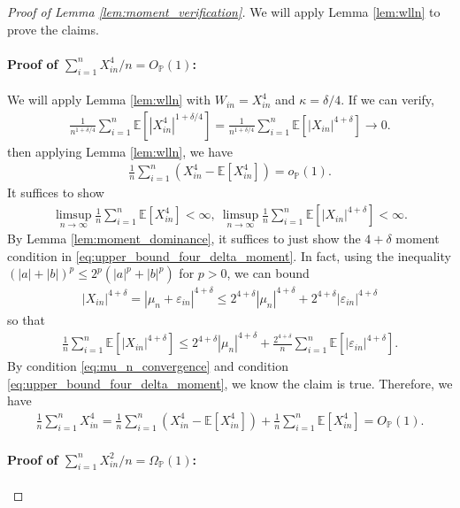 \documentclass[12pt]{article}
\theoremstyle{definition}
\def\P{\mathbb{P}}
\def\P{\mathbb{P}}
\newcommand{\E}{\mathbb E}								%
\renewcommand{\P}{\mathbb{P}}							%
\begin{document}
	\begin{proof}[Proof of Lemma \ref{lem:moment_verification}]
		We will apply Lemma \ref{lem:wlln} to prove the claims. 
	
		\paragraph{Proof of $\sum_{i=1}^n X_{in}^4/n=O_{\P}(1)$:}
		
		We will apply Lemma \ref{lem:wlln} with $W_{in}=X_{in}^4$ and $\kappa=\delta/4$. If we can verify,
		\begin{align*}
			\frac{1}{n^{1+\delta/4}}\sum_{i=1}^n\E[|X_{in}^4|^{1+\delta/4}]=\frac{1}{n^{1+\delta/4}}\sum_{i=1}^n\E[|X_{in}|^{4+\delta}]\rightarrow 0.
		\end{align*}
		then applying Lemma \ref{lem:wlln}, we have 
		\begin{align*}
			\frac{1}{n}\sum_{i=1}^n (X_{in}^4-\E[X_{in}^4])=o_{\P}(1).	
		\end{align*}
		It suffices to show 
		\begin{align}\label{eq:upper_bound_fourth_moment}
			\limsup_{n\rightarrow\infty}\frac{1}{n}\sum_{i=1}^n \E[X_{in}^{4}]<\infty,\ \limsup_{n\rightarrow\infty}\frac{1}{n}\sum_{i=1}^n \E[|X_{in}|^{4+\delta}]<\infty.
		\end{align}
		By Lemma \eqref{lem:moment_dominance}, it suffices to just show the $4+\delta$ moment condition in \eqref{eq:upper_bound_four_delta_moment}. In fact, using the inequality $(|a|+|b|)^{p}\leq 2^p (|a|^p+|b|^p)$ for $p>0$, we can bound 
		\begin{align*}
			|X_{in}|^{4+\delta}=|\mu_n+\varepsilon_{in}|^{4+\delta}\leq 2^{4+\delta}|\mu_n|^{4+\delta}+2^{4+\delta}|\varepsilon_{in}|^{4+\delta}
		\end{align*}
		so that 
		\begin{align*}
			\frac{1}{n}\sum_{i=1}^n \E[|X_{in}|^{4+\delta}]\leq 2^{4+\delta}|\mu_n|^{4+\delta}+\frac{2^{4+\delta}}{n}\sum_{i=1}^n\E[|\varepsilon_{in}|^{4+\delta}].
		\end{align*}
		By condition \eqref{eq:mu_n_convergence} and condition \eqref{eq:upper_bound_four_delta_moment}, we know the claim is true. Therefore, we have 
		\begin{align*}
			\frac{1}{n}\sum_{i=1}^n X_{in}^4=\frac{1}{n}\sum_{i=1}^n (X_{in}^4-\E[X_{in}^4])+ \frac{1}{n}\sum_{i=1}^n \E[X_{in}^4]=O_{\P}(1).
		\end{align*}
		
		\paragraph{Proof of $\sum_{i=1}^n X_{in}^2/n=\Omega_{\P}(1)$:}
		

\end{proof}
\end{document}
